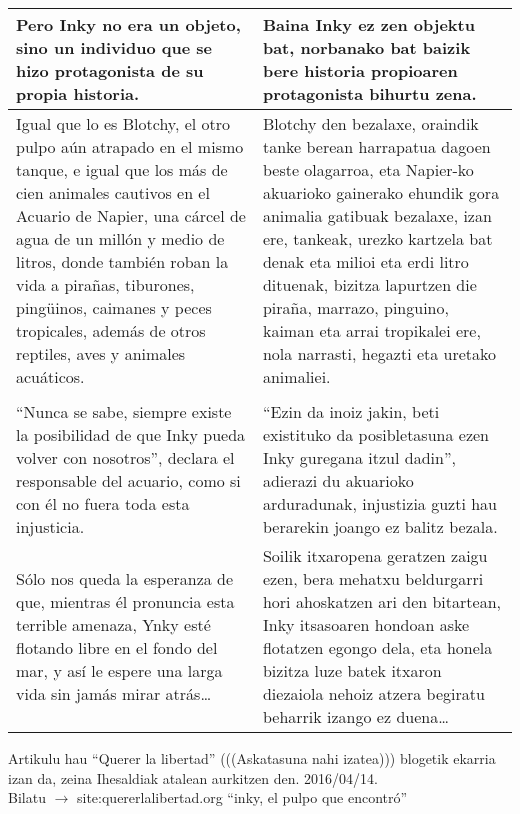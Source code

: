 \documentclass{article}
\begin{document}
\begin{center}
\begin{longtable}{|p{6cm}|p{6cm}|}
  \midrule
  Pero Inky no era un objeto, sino un individuo que se hizo protagonista de su propia historia.&
  Baina Inky ez zen objektu bat, norbanako bat baizik bere historia propioaren protagonista bihurtu zena.\\

  \midrule
  Igual que lo es Blotchy, el otro pulpo aún atrapado en el mismo tanque, e igual que los más de cien animales cautivos en el Acuario de Napier, una cárcel de agua de un millón y medio de litros, donde también roban la vida a pirañas, tiburones, pingüinos, caimanes y peces tropicales, además de otros reptiles, aves y animales acuáticos.&
  Blotchy den bezalaxe, oraindik tanke berean harrapatua dagoen beste olagarroa, eta Napier-ko akuarioko gainerako ehundik gora animalia gatibuak bezalaxe, izan ere, tankeak, urezko kartzela bat denak eta milioi eta erdi litro dituenak, bizitza lapurtzen die piraña, marrazo, pinguino, kaiman eta arrai tropikalei ere, nola narrasti, hegazti eta uretako animaliei.\\

  \midrule
  \cellcolor{lightgray}{\textbf{Párrafo}} &
  \cellcolor{lightgray}{\textbf{Paragrafoa}}\\
  
  \midrule
  ``Nunca se sabe, siempre existe la posibilidad de que Inky pueda volver con nosotros'', declara el responsable del acuario, como si con él no fuera toda esta injusticia.&
  ``Ezin da inoiz jakin, beti existituko da posibletasuna ezen Inky guregana itzul dadin'', adierazi du akuarioko arduradunak, injustizia guzti hau berarekin joango ez balitz bezala.\\

  \midrule
  Sólo nos queda la esperanza de que, mientras él pronuncia esta terrible amenaza, Ynky esté flotando libre en el fondo del mar, y así le espere una larga vida sin jamás mirar atrás\ldots&
  Soilik itxaropena geratzen zaigu ezen, bera mehatxu beldurgarri hori ahoskatzen ari den bitartean, Inky itsasoaren hondoan aske flotatzen egongo dela, eta honela bizitza luze batek itxaron diezaiola nehoiz atzera begiratu beharrik izango ez duena\ldots\\

  \bottomrule
\end{longtable}
\end{center}


\begin{center}
  Artikulu hau ``Querer la libertad'' (((Askatasuna nahi izatea))) blogetik ekarria izan da, zeina Ihesaldiak atalean aurkitzen den. 2016/04/14. \\
  Bilatu $\rightarrow$ site:quererlalibertad.org ``inky, el pulpo que encontró''
\end{center}
\end{document}
